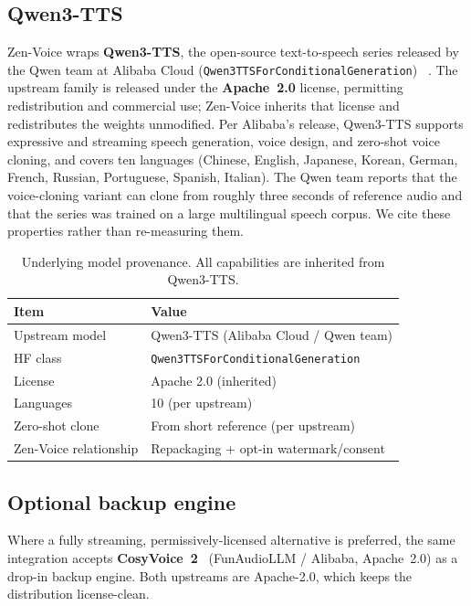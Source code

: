 \documentclass[11pt,a4paper]{article}
\begin{document}
\subsection{Qwen3-TTS}

Zen-Voice wraps \textbf{Qwen3-TTS}, the open-source text-to-speech series released by
the Qwen team at Alibaba Cloud (\texttt{Qwen3TTSForConditionalGeneration})
~\citep{qwen3tts}. The upstream family is released under the \textbf{Apache~2.0}
license, permitting redistribution and commercial use; Zen-Voice inherits that license
and redistributes the weights unmodified. Per Alibaba's release, Qwen3-TTS supports
expressive and streaming speech generation, voice design, and zero-shot voice cloning,
and covers ten languages (Chinese, English, Japanese, Korean, German, French, Russian,
Portuguese, Spanish, Italian). The Qwen team reports that the voice-cloning variant
can clone from roughly three seconds of reference audio and that the series was trained
on a large multilingual speech corpus. We cite these properties rather than
re-measuring them.

\begin{table}[H]
\centering
\caption{Underlying model provenance. All capabilities are inherited from Qwen3-TTS.}
\label{tab:provenance}
\begin{tabular}{ll}
\toprule
\textbf{Item} & \textbf{Value} \\
\midrule
Upstream model & Qwen3-TTS (Alibaba Cloud / Qwen team) \\
HF class & \texttt{Qwen3TTSForConditionalGeneration} \\
License & Apache 2.0 (inherited) \\
Languages & 10 (per upstream) \\
Zero-shot clone & From short reference (per upstream) \\
Zen-Voice relationship & Repackaging + opt-in watermark/consent \\
\bottomrule
\end{tabular}
\end{table}

\subsection{Optional backup engine}

Where a fully streaming, permissively-licensed alternative is preferred, the same
integration accepts \textbf{CosyVoice~2}~\citep{cosyvoice2} (FunAudioLLM / Alibaba,
Apache~2.0) as a drop-in backup engine. Both upstreams are Apache-2.0, which keeps the
distribution license-clean.
\end{document}
